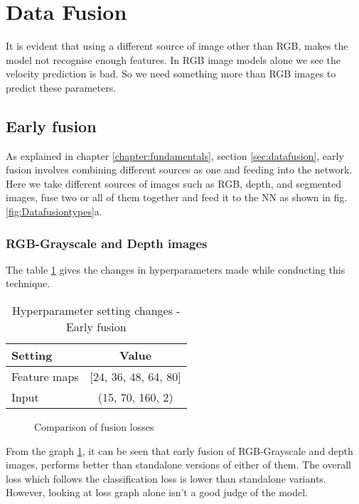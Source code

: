 \section{Data Fusion}
It is evident that using a different source of image other than RGB, makes the model not
recognise enough features. In RGB image models alone we see the velocity prediction is bad. So we need
something more than RGB images to predict these parameters.

\subsection{Early fusion}
As explained in chapter \ref{chapter:fundamentals}, section \ref{sec:datafusion}, early
fusion involves combining different sources as one and feeding into the network. Here we
take different sources of images such as RGB, depth, and segmented images, fuse two or all
of them together and feed it to the NN as shown in fig. \ref{fig:Datafusiontypes}a.
\subsubsection*{RGB-Grayscale and Depth images}
The table \ref{table:paramsEF} gives the changes in hyperparameters made while conducting
this technique.

\begin{table}[!ht]
    \centering
\begin{tabular}{lc}
    \toprule
    Setting  & Value  \\\midrule
    Feature maps  & [24, 36, 48, 64, 80]  \\
    Input  & (15, 70, 160, 2)\\\bottomrule
\end{tabular}
\caption{Hyperparameter setting changes - Early fusion}
\label{table:paramsEF}
\end{table}
\begin{figure}[!ht]
    \centering
    \def\svgwidth{\textwidth}
    \caption{Comparison of fusion losses}
    \label{fig:datafusionlosses1}
\end{figure}
From the graph \ref{fig:datafusionlosses1}, it can be seen that early fusion of
RGB-Grayscale and depth images, performs better than standalone versions of either of
them. The overall loss which follows the classification loss is lower than standalone
variants. However, looking at loss graph alone isn't a good judge of the model.

